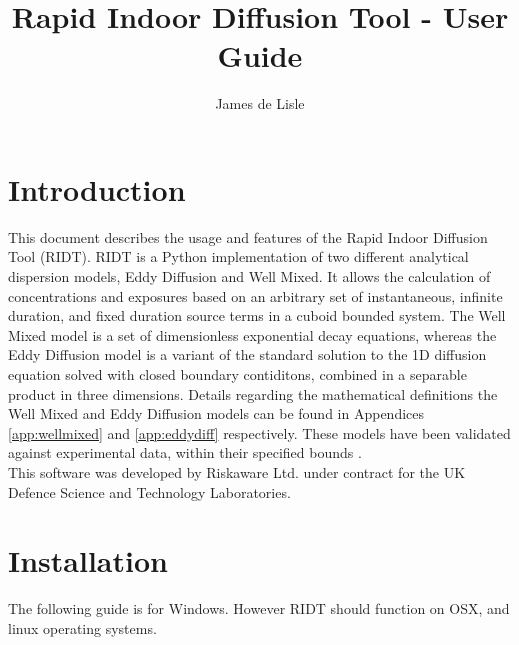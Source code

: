 \documentclass[]{article}
\title{Rapid Indoor Diffusion Tool - User Guide}
\author{James de Lisle}
\begin{document}
\maketitle

\tableofcontents

\section{Introduction}

This document describes the usage and features of the Rapid Indoor Diffusion
Tool (RIDT). RIDT is a Python implementation of two different analytical
dispersion models, Eddy Diffusion and Well Mixed. It allows the calculation of
concentrations and exposures based on an arbitrary set of instantaneous,
infinite duration, and fixed duration source terms in a cuboid bounded system.
The Well Mixed model is a set of dimensionless exponential decay equations,
whereas the Eddy Diffusion model is a variant of the standard solution to the 1D
diffusion equation solved with closed boundary contiditons, combined in a
separable product in three dimensions. Details regarding the mathematical
definitions the Well Mixed and Eddy Diffusion models can be found in Appendices
\ref{app:wellmixed} and \ref{app:eddydiff} respectively. These models have been
validated against experimental data, within their specified bounds
\cite{foat20}.\\

\noindent This software was developed by Riskaware Ltd. under contract for the UK Defence
Science and Technology Laboratories.\\

\section{Installation}\label{sec:installation}

The following guide is for Windows. However RIDT should function on OSX, and
linux operating systems.
\end{document}
